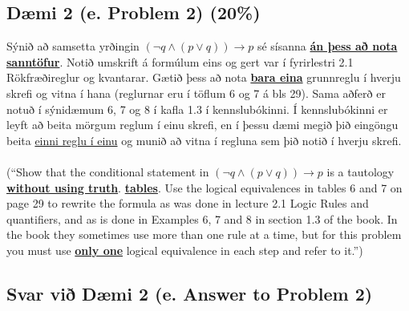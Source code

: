 \newpage
\subsection*{Dæmi 2 (e. Problem 2) (20\%)\label{section:problem2}}
Sýnið að samsetta yrðingin $(\neg q\land (p\lor q)) \to p$ sé sísanna \underline{\textbf{án þess að nota sanntöfur}}. Notið umskrift á formúlum eins og gert var í fyrirlestri 2.1 Rökfræðireglur og kvantarar.  Gætið þess að nota \underline{\textbf{bara eina}} grunnreglu í hverju skrefi og vitna í hana (reglurnar eru í töflum 6 og 7 á bls 29). Sama aðferð er notuð í sýnidæmum  6, 7 og 8 í kafla 1.3 í kennslubókinni. Í kennslubókinni er leyft að beita mörgum reglum í einu skrefi, en í þessu dæmi megið þið eingöngu beita \underline{einni reglu í einu} og munið að vitna í regluna sem þið notið í hverju skrefi.\\
\\
(“Show that the conditional statement in $(\neg q\land (p\lor q)) \to p$ is a tautology \underline{\textbf{without using truth}}. \underline{\textbf{tables}}. Use the logical equivalences in tables 6 and 7 on page 29 to rewrite the formula as was done in lecture 2.1 Logic Rules and quantifiers, and as is done in Examples 6, 7 and 8 in section 1.3 of the book. In the book they sometimes use more than one rule at a time, but for this problem you must use \underline{\textbf{only one}} logical equivalence in each step and refer to it.”)

\subsection*{Svar við Dæmi 2 (e. Answer to Problem 2)}

\newcommand{\makeAnswerBoxProblemFour}{
  \noindent
  \begin{tcolorbox}[colframe=black, colback=white, boxrule=0.5pt, arc=0pt, outer arc=0pt, height=\dimexpr\textheight-\ht\strutbox-16\baselineskip\relax]

    
  \end{tcolorbox}
}

\makeAnswerBoxProblemFour

